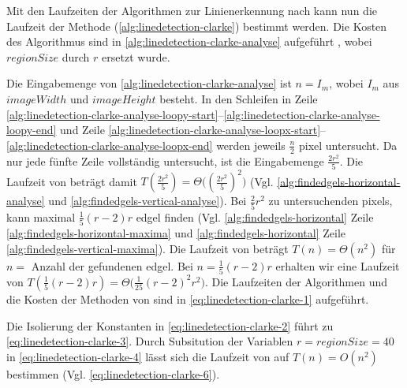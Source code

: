 Mit den Laufzeiten der Algorithmen zur Linienerkennung nach \citeauthor{clarke96} kann nun die Laufzeit der Methode
  (\autoref{alg:linedetection-clarke}) bestimmt werden. Die Kosten des Algorithmus sind in \autoref{alg:linedetection-clarke-analyse} aufgeführt , wobei $\mathit{regionSize}$ durch $r$ ersetzt wurde.

Die Eingabemenge von \autoref{alg:linedetection-clarke-analyse} ist $n = I_m$, wobei $I_m$ aus $\mathit{imageWidth}$
 und $\mathit{imageHeight}$ besteht. In den Schleifen in Zeile
 \ref{alg:linedetection-clarke-analyse-loopy-start}--\ref{alg:linedetection-clarke-analyse-loopy-end} und Zeile
 \ref{alg:linedetection-clarke-analyse-loopx-start}--\ref{alg:linedetection-clarke-analyse-loopx-end} werden jeweils
 $\tfrac{n}{2}$ \gls{pixel} untersucht. Da  nur jede fünfte Zeile vollständig untersucht, ist die
 Eingabemenge $\tfrac{2 r^2}{5}$. Die Laufzeit von  beträgt damit
 $T(\tfrac{2 r^2}{5}) = \Theta\bigl((\tfrac{2 r^2}{5})^2\bigr)$
 (Vgl. \autoref{alg:findedgels-horizontal-analyse} und \autoref{alg:findedgels-vertical-analyse}). Bei
 $\tfrac{2}{5}r^2$ zu untersuchenden \glspl{pixel}, kann  maximal $\tfrac{1}{5}(r - 2)r$
 \gls{edgel} finden (Vgl. \autoref{alg:findedgels-horizontal} Zeile \ref{alg:findedgels-horizontal-maxima} und
 \autoref{alg:findedgels-horizontal} Zeile \ref{alg:findedgels-vertical-maxima}). Die Laufzeit von
  beträgt $T(n) = \Theta(n^2)$ für $n = $ Anzahl der gefundenen \gls{edgel}. Bei
 $n = \tfrac{1}{5}(r - 2)r$ erhalten wir eine Laufzeit von
 $T(\tfrac{1}{5}(r - 2)r) = \Theta\bigl(\tfrac{1}{25}(r - 2)^2 r^2\bigr)$. Die Laufzeiten der Algorithmen und die Kosten
 der Methoden von  sind in \autoref{eq:linedetection-clarke-1} aufgeführt.

Die Isolierung der Konstanten in \autoref{eq:linedetection-clarke-2} führt zu \autoref{eq:linedetection-clarke-3}.
 Durch Subsitution der Variablen $r = \mathit{regionSize} = 40$ in \autoref{eq:linedetection-clarke-4} lässt sich die
 Laufzeit von  auf $T(n) = O(n^2)$ bestimmen (Vgl. \autoref{eq:linedetection-clarke-6}).
